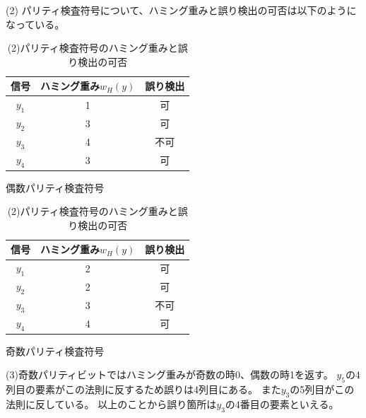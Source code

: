 \documentclass[a4paper,11pt]{ltjsarticle}
\begin{document}
(2)
パリティ検査符号について、ハミング重みと誤り検出の可否は以下のようになっている。
\begin{table}[h]
  \begin{minipage}[t]{.45\textwidth}
    \begin{center}
      \begin{tabular}{c|c|c}
        信号 & ハミング重み$w_{H}(y)$ & 誤り検出 \\ \hline
        $y_{1}$ & 1 & 可 \\
        $y_{2}$ & 3 & 可 \\
        $y_{3}$ & 4 & 不可 \\
        $y_{4}$ & 3 & 可 \\
      \end{tabular}
    \end{center}
    \caption{偶数パリティ検査符号}
  \end{minipage}
  \hfill
  \begin{minipage}[t]{.45\textwidth}
    \begin{center}
      \begin{tabular}{c|c|c}
        信号 & ハミング重み$w_{H}(y)$ & 誤り検出 \\ \hline
        $y_{1}$ & 2 & 可 \\
        $y_{2}$ & 2 & 可 \\
        $y_{3}$ & 3 & 不可 \\
        $y_{4}$ & 4 & 可 \\
      \end{tabular}
    \end{center}
    \caption{奇数パリティ検査符号}
  \end{minipage}
  \caption{(2)パリティ検査符号のハミング重みと誤り検出の可否}
\end{table}

(3)奇数パリティビットではハミング重みが奇数の時0、偶数の時1を返す。
$y_{5}$の4列目の要素がこの法則に反するため誤りは4列目にある。
また$y_{3}$の5列目がこの法則に反している。
以上のことから誤り箇所は$y_{3}$の4番目の要素といえる。
\end{document}
